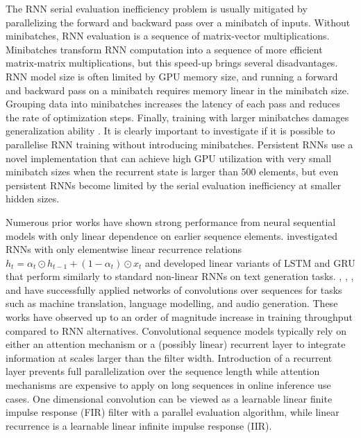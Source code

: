 \documentclass{article}
\begin{document}
The RNN serial evaluation inefficiency problem is usually mitigated by
parallelizing the forward and backward pass over a minibatch of inputs. Without
minibatches, RNN evaluation is a sequence of matrix-vector
multiplications. Minibatches transform RNN computation into a sequence of more
efficient matrix-matrix multiplications, but this speed-up brings several
disadvantages.  RNN model size is often limited by GPU memory size, and running
a forward and backward pass on a minibatch requires memory linear in the
minibatch size.  Grouping data into minibatches increases the latency of each
pass and reduces the rate of optimization steps. Finally, training with larger
minibatches damages generalization ability \cite{keskar2017large}. It is clearly
important to investigate if it is possible to parallelise RNN training without
introducing minibatches. Persistent RNNs \cite{diamos2016persistent} use a novel
implementation that can achieve high GPU utilization with very small minibatch
sizes when the recurrent state is larger than 500 elements, but even persistent
RNNs become limited by the serial evaluation inefficiency at smaller hidden
sizes.

Numerous prior works have shown strong performance from neural sequential models
with only linear dependence on earlier sequence
elements. \citet{balduzzi2016strongly} investigated RNNs with only elementwise
linear recurrence relations $h_t = \alpha_t \odot h_{t-1} + (1-\alpha_t) \odot
x_t$ and developed linear variants of LSTM and GRU that perform similarly to
standard non-linear RNNs on text generation tasks. \citet{bradbury2017quasi},
\citet{kalchbrenner2016neural}, \citet{gehring2017convolutional}, and
\citet{van2016wavenet} have successfully applied networks of convolutions over
sequences for tasks such as machine translation, language modelling, and audio
generation.  These works have observed up to an order of magnitude increase in
training throughput compared to RNN alternatives. Convolutional sequence models
typically rely on either an attention mechanism or a (possibly linear) recurrent
layer to integrate information at scales larger than the filter
width. Introduction of a recurrent layer prevents full parallelization over the
sequence length while attention mechanisms are expensive to apply on long
sequences in online inference use cases.  One dimensional convolution can be
viewed as a learnable linear finite impulse response (FIR) filter with a
parallel evaluation algorithm, while linear recurrence is a learnable linear
infinite impulse response (IIR).
\end{document}
